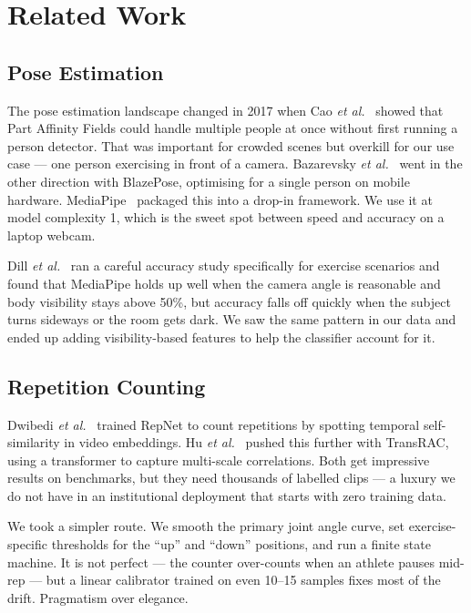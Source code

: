 \documentclass[conference]{IEEEtran}
\begin{document}
\section{Related Work}

\subsection{Pose Estimation}
The pose estimation landscape changed in 2017 when Cao \textit{et al.}~\cite{cao2017} showed that Part Affinity Fields could handle multiple people at once without first running a person detector. That was important for crowded scenes but overkill for our use case --- one person exercising in front of a camera. Bazarevsky \textit{et al.}~\cite{bazarevsky2020} went in the other direction with BlazePose, optimising for a single person on mobile hardware. MediaPipe~\cite{lugaresi2019} packaged this into a drop-in framework. We use it at model complexity 1, which is the sweet spot between speed and accuracy on a laptop webcam.

Dill \textit{et al.}~\cite{dill2023} ran a careful accuracy study specifically for exercise scenarios and found that MediaPipe holds up well when the camera angle is reasonable and body visibility stays above 50\%, but accuracy falls off quickly when the subject turns sideways or the room gets dark. We saw the same pattern in our data and ended up adding visibility-based features to help the classifier account for it.

\subsection{Repetition Counting}
Dwibedi \textit{et al.}~\cite{dwibedi2020} trained RepNet to count repetitions by spotting temporal self-similarity in video embeddings. Hu \textit{et al.}~\cite{hu2022} pushed this further with TransRAC, using a transformer to capture multi-scale correlations. Both get impressive results on benchmarks, but they need thousands of labelled clips --- a luxury we do not have in an institutional deployment that starts with zero training data.

We took a simpler route. We smooth the primary joint angle curve, set exercise-specific thresholds for the ``up'' and ``down'' positions, and run a finite state machine. It is not perfect --- the counter over-counts when an athlete pauses mid-rep --- but a linear calibrator trained on even 10--15 samples fixes most of the drift. Pragmatism over elegance.
\end{document}
